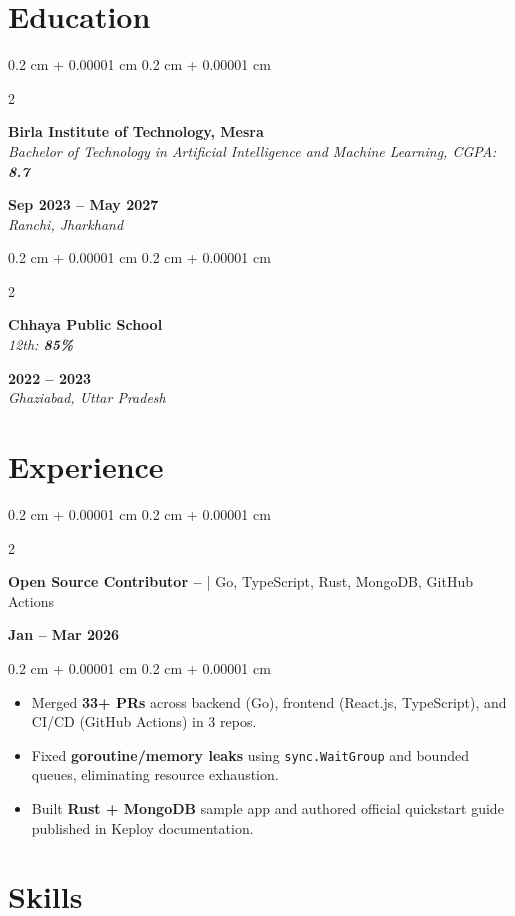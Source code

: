 \documentclass[10pt, letterpaper]{article}
\newenvironment{highlights}{
    \begin{itemize}[
        topsep=0.05 cm,
        parsep=0.05 cm,
        partopsep=0pt,
        itemsep=0pt,
        leftmargin=0.4 cm + 10pt
    ]
}{
    \end{itemize}
} %
\newenvironment{onecolentry}{
    \begin{adjustwidth}{
        0.2 cm + 0.00001 cm
    }{
        0.2 cm + 0.00001 cm
    }
}{
    \end{adjustwidth}
} %
\newenvironment{twocolentry}[2][]{
    \onecolentry
    \def\secondColumn{#2}
    \setcolumnwidth{\fill, 4.5 cm}
    \begin{paracol}{2}
}{
    \switchcolumn \raggedleft \secondColumn
    \end{paracol}
    \endonecolentry
} %
\let\hrefWithoutArrow\href
\renewcommand{\href}[2]{\hrefWithoutArrow{#1}{\ifthenelse{\equal{#2}{}}{ }{#2 }\raisebox{.15ex}{\footnotesize \faExternalLink*}}}
\begin{document}
\section{Education}
\vspace{0.02cm}

\begin{twocolentry}{
    \textbf{Sep 2023 -- May 2027} \\
    \textit{Ranchi, Jharkhand}
}
\textbf{Birla Institute of Technology, Mesra} \\
\textit{Bachelor of Technology in Artificial Intelligence and Machine Learning, CGPA: \textbf{8.7}}
\end{twocolentry}

\vspace{0.02cm}

\begin{twocolentry}{
    \textbf{2022 -- 2023} \\
    \textit{Ghaziabad, Uttar Pradesh}
}
\textbf{Chhaya Public School}\\
\textit{12th: \textbf{85\%}}
\end{twocolentry}


\section{Experience}
\vspace{0.02 cm}

\begin{twocolentry}{
    \textbf{Jan -- Mar 2026}
}
\textbf{Open Source Contributor -- \href{https://github.com/keploy/keploy}{Keploy}} | Go, TypeScript, Rust, MongoDB, GitHub Actions
\end{twocolentry}

\begin{onecolentry}
\begin{highlights}
\item Merged \textbf{33+ PRs} across backend (Go), frontend (React.js, TypeScript), and CI/CD (GitHub Actions) in 3 repos.
\item Fixed \textbf{goroutine/memory leaks} using \texttt{sync.WaitGroup} and bounded queues, eliminating resource exhaustion.
\item Built \textbf{Rust + MongoDB} sample app and authored official quickstart guide published in Keploy documentation.
\end{highlights}
\end{onecolentry}


\section{Skills}
\end{document}
